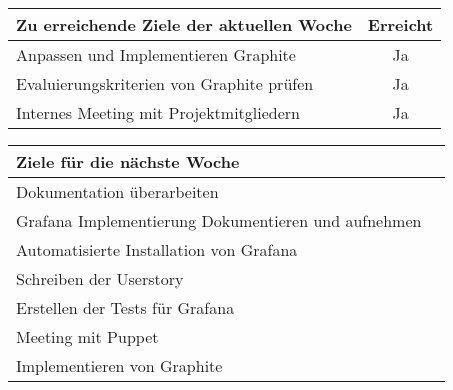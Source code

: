 \begin{tabularx}{\textwidth}{Xc}
    \arrayrulecolor{OliveGreen}
    \toprule
    {\bfseries Zu erreichende Ziele der aktuellen Woche} & {\bfseries Erreicht} \\
    \midrule[2pt]
    Anpassen und Implementieren Graphite                    &Ja              \\
    \rowcolor{OliveGreen!15}
    Evaluierungskriterien von Graphite prüfen               &Ja              \\
    \rowcolor{White}
    Internes Meeting mit Projektmitgliedern                 &Ja              \\
    \bottomrule[2pt]
\end{tabularx}
%
\vspace{1cm}
%
\begin{tabularx}{\textwidth}{Xc}
    \arrayrulecolor{OliveGreen}
    \toprule
    {\bfseries Ziele für die nächste Woche}        &                         \\
    \midrule[2pt]
    Dokumentation überarbeiten                     &                         \\
    \rowcolor{OliveGreen!15}
    Grafana Implementierung Dokumentieren und aufnehmen   &                  \\
    \rowcolor{White}
    Automatisierte Installation von Grafana        &                         \\
    \rowcolor{OliveGreen!15}
    Schreiben der Userstory                        &                         \\
    \rowcolor{White}
    Erstellen der Tests für Grafana                &                         \\
    \rowcolor{OliveGreen!15}
    Meeting mit Puppet                             &                         \\
    \rowcolor{White}
    Implementieren von Graphite                    &                         \\
\end{tabularx}
